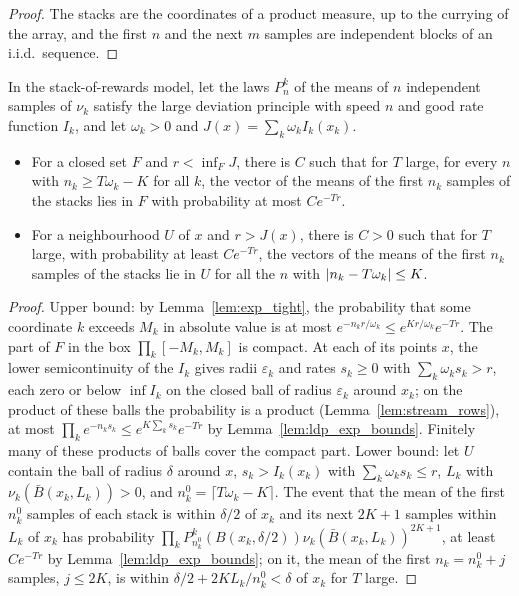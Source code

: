 \begin{proof}
  \leanok
  The stacks are the coordinates of a product measure, up to the currying of the array, and the
  first $n$ and the next $m$ samples are independent blocks of an i.i.d.\ sequence.
\end{proof}

\begin{lemma}
  \label{lem:ldp_pi}
  \leanok
  In the stack-of-rewards model, let the laws $P^k_n$ of the means of $n$ independent samples of
  $\nu_k$ satisfy the large deviation principle with speed $n$ and good rate function $I_k$, and
  let $\omega_k > 0$ and $J(x) = \sum_k \omega_k I_k(x_k)$.
  \begin{itemize}
    \item For a closed set $F$ and $r < \inf_F J$, there is $C$ such that for $T$ large, for every
      $n$ with $n_k \ge T \omega_k - K$ for all $k$, the vector of the means of the first $n_k$
      samples of the stacks lies in $F$ with probability at most $C e^{-T r}$.
    \item For a neighbourhood $U$ of $x$ and $r > J(x)$, there is $C > 0$ such that for $T$ large,
      with probability at least $C e^{-T r}$, the vectors of the means of the first $n_k$ samples
      of the stacks lie in $U$ for all the $n$ with $\lvert n_k - T \omega_k \rvert \le K$.
  \end{itemize}
\end{lemma}

\begin{proof}
  \leanok
  Upper bound: by Lemma~\ref{lem:exp_tight}, the probability that some coordinate $k$ exceeds
  $M_k$ in absolute value is at most $e^{-n_k r / \omega_k} \le e^{K r / \omega_k} e^{-T r}$. The
  part of $F$ in the box $\prod_k [-M_k, M_k]$ is compact. At each of its points $x$, the lower
  semicontinuity of the $I_k$ gives radii $\varepsilon_k$ and rates $s_k \ge 0$ with $\sum_k
  \omega_k s_k > r$, each zero or below $\inf I_k$ on the closed ball of radius $\varepsilon_k$
  around $x_k$; on the product of these balls the probability is a product
  (Lemma~\ref{lem:stream_rows}), at most $\prod_k e^{-n_k s_k} \le e^{K \sum_k s_k} e^{-T r}$ by
  Lemma~\ref{lem:ldp_exp_bounds}. Finitely many of these products of balls cover the compact part.
  Lower bound: let $U$ contain the ball of radius $\delta$ around $x$, $s_k > I_k(x_k)$ with
  $\sum_k \omega_k s_k \le r$, $L_k$ with $\nu_k(\bar B(x_k, L_k)) > 0$, and $n^0_k = \lceil T
  \omega_k - K \rceil$. The event that the mean of the first $n^0_k$ samples of each stack is within
  $\delta / 2$ of $x_k$ and its next $2K + 1$ samples within $L_k$ of $x_k$ has probability
  $\prod_k P^k_{n^0_k}(B(x_k, \delta / 2)) \nu_k(\bar B(x_k, L_k))^{2K + 1}$, at least $C e^{-T r}$
  by Lemma~\ref{lem:ldp_exp_bounds}; on it, the mean of the first $n_k = n^0_k + j$ samples, $j \le
  2K$, is within $\delta / 2 + 2 K L_k / n^0_k < \delta$ of $x_k$ for $T$ large.
\end{proof}


